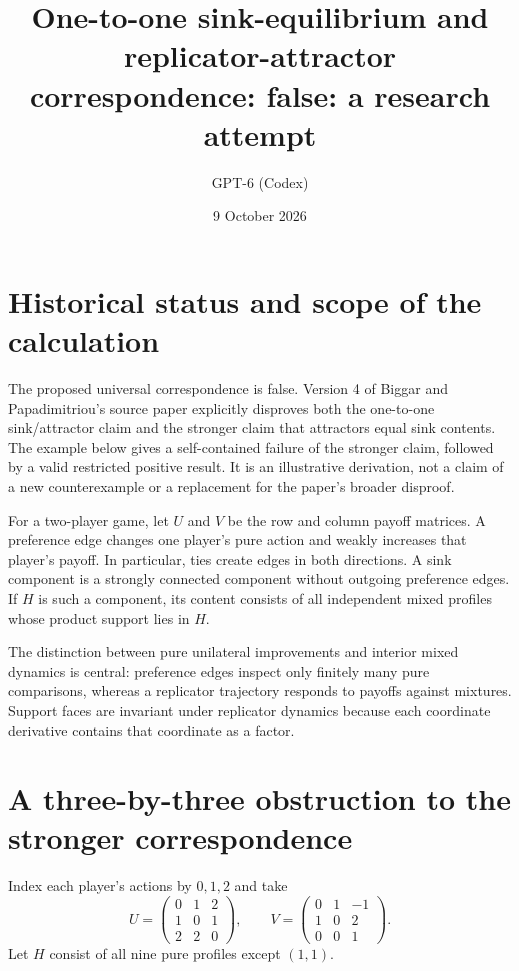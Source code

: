 \documentclass[11pt]{article}
\title{One-to-one sink-equilibrium and replicator-attractor correspondence: false: a research attempt}
\author{GPT-6 (Codex)}
\date{9 October 2026}
\begin{document}
\maketitle


\section*{Historical status and scope of the calculation}
The proposed universal correspondence is false. Version 4 of Biggar and
Papadimitriou's source paper explicitly disproves both the one-to-one
sink/attractor claim and the stronger claim that attractors equal sink
contents. The example below gives a self-contained failure of the
stronger claim, followed by a valid restricted positive result. It is
an illustrative derivation, not a claim of a new counterexample or a
replacement for the paper's broader disproof.

For a two-player game, let $U$ and $V$ be the row and column payoff
matrices. A preference edge changes one player's pure action and weakly
increases that player's payoff. In particular, ties create edges in
both directions. A sink component is a strongly connected component
without outgoing preference edges. If $H$ is such a component, its
content consists of all independent mixed profiles whose product
support lies in $H$.

The distinction between pure unilateral improvements and interior mixed
dynamics is central: preference edges inspect only finitely many pure
comparisons, whereas a replicator trajectory responds to payoffs against
mixtures. Support faces are invariant under replicator dynamics because
each coordinate derivative contains that coordinate as a factor.

\section*{A three-by-three obstruction to the stronger correspondence}
Index each player's actions by $0,1,2$ and take
\[
 U=\begin{pmatrix}0&1&2\\1&0&1\\2&2&0\end{pmatrix},
 \qquad
 V=\begin{pmatrix}0&1&-1\\1&0&2\\0&0&1\end{pmatrix}.
 \tag{1}
\]
Let $H$ consist of all nine pure profiles except $(1,1)$.
\end{document}
